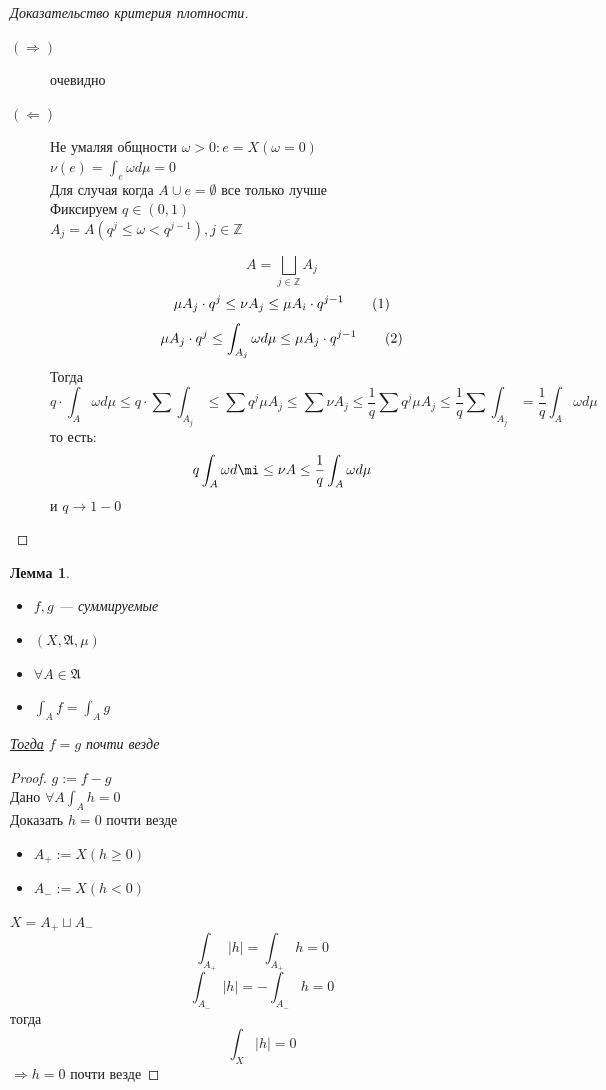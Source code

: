 \documentclass[oneside]{book}
\newcommand\addtag{\refstepcounter{equation}\tag{\theequation}}
\newcommand{\A}{\mathfrak{A}}
\theoremstyle{plain}
\newtheorem{lemma}{Лемма}
\theoremstyle{remark}
\theoremstyle{definition}
\begin{document}
\begin{proof}[Доказательство критерия плотности]
\begin{description}
\item[{\((\Rightarrow)\)}] очевидно
\item[{\((\Leftarrow)\)}] Не умаляя общности \(\omega > 0: e = X(\omega = 0)\) \\
\(\nu(e) = \int_e \omega d\mu = 0\) \\
Для случая когда \(A \cup e = \emptyset\) все только лучше \\
Фиксируем \(q \in (0, 1)\) \\
\(A_j = A(q^j \le \omega < q^{j - 1}), j \in \mathbb{Z}\) \\
\begin{center}
\end{center}
\[ A = \bigsqcup_{j \in \mathbb{Z}} A_j \]
\[ \mu A_j \cdot q^{j} \le \nu A_j \le \mu A_i \cdot q^{j - 1} \addtag\label{5_1_neq}\]
\[ \mu A_j \cdot q^j \le \int_{A_j} \omega d\mu \le \mu A_j \cdot q^{j - 1} \addtag\label{5_2_neq} \]
Тогда
\[ q \cdot \int_A \omega d\mu \le q \cdot \sum \int_{A_j} \le \sum q^j \mu A_j \le \sum \nu A_j \le \frac{1}{q} \sum q^j \mu A_j \le \frac{1}{q} \sum \int_{A_j} = \frac{1}{q} \int_A \omega d\mu \ \]
то есть:
\[ q \int_A \omega d\mi \le \nu A \le \frac{1}{q} \int_A \omega d\mu \]
и \(q \to 1 - 0\)
\end{description}
\end{proof}
\begin{lemma}
\-
\begin{itemize}
\item \(f, g\) --- суммируемые
\item \((X, \A, \mu)\)
\item \(\forall A \in \A\)
\item \(\int_A f = \int_A g\)
\end{itemize}
\uline{Тогда} \(f = g\) почти везде
\end{lemma}
\begin{proof}
\(g := f - g\) \\
Дано \(\forall A \int_A h = 0\) \\
Доказать \(h = 0\) почти везде \\
\begin{itemize}
\item \(A_{+} := X(h \ge 0)\)
\item \(A_{-} := X(h < 0)\)
\end{itemize}
\(X = A_+ \sqcup A_-\)
\[ \int_{A_+} |h| = \int_{A_+} h = 0 \]
\[ \int_{A_-} |h| = -\int_{A_-} h = 0 \]
тогда \[ \int_X |h| = 0 \]
\(\Rightarrow h = 0\) почти везде
\end{proof}
\end{document}
